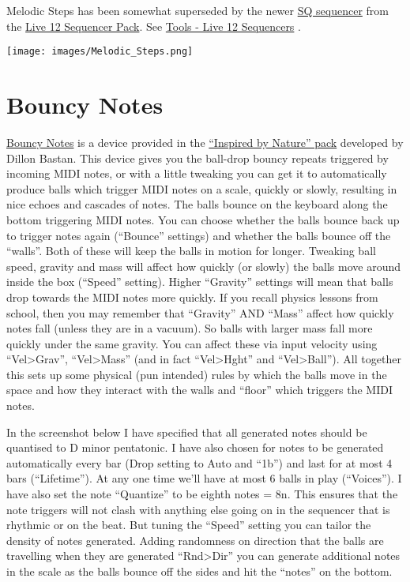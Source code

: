 \documentclass[
  12pt,
  letterpaper,
  oneside,
  open=any]{scrbook}
\begin{document}
Melodic Steps has been somewhat superseded by the newer
\href{https://www.youtube.com/watch?v=1obXGz-Zfa8}{SQ sequencer} from
the \href{https://www.ableton.com/en/packs/sequencers}{Live 12 Sequencer
Pack}. See \hyperref[Chapter-031-Tools-Live12_Sequencers]{Tools - Live
12 Sequencers} .

\texttt{[image: images/Melodic\_Steps.png]}

\section{Bouncy Notes}\label{bouncy-notes}

\href{https://www.youtube.com/watch?v=C2hQ-WbKBhU}{Bouncy Notes} is a
device provided in the
\href{https://www.ableton.com/en/packs/inspired-nature/\#?item_type=max_for_live}{``Inspired
by Nature'' pack} developed by Dillon Bastan. This device gives you the
ball-drop bouncy repeats triggered by incoming MIDI notes, or with a
little tweaking you can get it to automatically produce balls which
trigger MIDI notes on a scale, quickly or slowly, resulting in nice
echoes and cascades of notes. The balls bounce on the keyboard along the
bottom triggering MIDI notes. You can choose whether the balls bounce
back up to trigger notes again (``Bounce'' settings) and whether the
balls bounce off the ``walls''. Both of these will keep the balls in
motion for longer. Tweaking ball speed, gravity and mass will affect how
quickly (or slowly) the balls move around inside the box (``Speed''
setting). Higher ``Gravity'' settings will mean that balls drop towards
the MIDI notes more quickly. If you recall physics lessons from school,
then you may remember that ``Gravity'' AND ``Mass'' affect how quickly
notes fall (unless they are in a vacuum). So balls with larger mass fall
more quickly under the same gravity. You can affect these via input
velocity using ``Vel\textgreater Grav'', ``Vel\textgreater Mass'' (and
in fact ``Vel\textgreater Hght'' and ``Vel\textgreater Ball''). All
together this sets up some physical (pun intended) rules by which the
balls move in the space and how they interact with the walls and
``floor'' which triggers the MIDI notes.

In the screenshot below I have specified that all generated notes should
be quantised to D minor pentatonic. I have also chosen for notes to be
generated automatically every bar (Drop setting to Auto and ``1b'') and
last for at most 4 bars (``Lifetime''). At any one time we'll have at
most 6 balls in play (``Voices''). I have also set the note ``Quantize''
to be eighth notes = 8n. This ensures that the note triggers will not
clash with anything else going on in the sequencer that is rhythmic or
on the beat. But tuning the ``Speed'' setting you can tailor the density
of notes generated. Adding randomness on direction that the balls are
travelling when they are generated ``Rnd\textgreater Dir'' you can
generate additional notes in the scale as the balls bounce off the sides
and hit the ``notes'' on the bottom.
\end{document}
